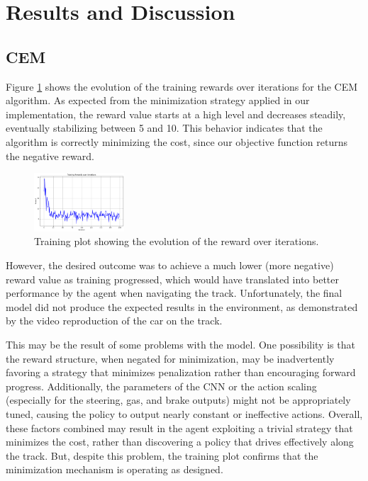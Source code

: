 \documentclass[../CSC_52081_EP.tex]{subfiles}
\begin{document}
\section{Results and Discussion}

\subsection{CEM}

Figure \ref{fig:train_plot} shows the evolution of the training rewards over iterations for the CEM algorithm. As expected from the minimization strategy applied in our implementation, the reward value starts at a high level and decreases steadily, eventually stabilizing between 5 and 10. This behavior indicates that the algorithm is correctly minimizing the cost, since our objective function returns the negative reward.

\begin{figure}[H]
    \centering
    \includegraphics[width=0.3\textwidth]{figures/CEM_train.png}
    \caption{Training plot showing the evolution of the reward over iterations.}
    \label{fig:train_plot}
\end{figure}

However, the desired outcome was to achieve a much lower (more negative) reward value as training progressed, which would have translated into better performance by the agent when navigating the track. Unfortunately, the final model did not produce the expected results in the environment, as demonstrated by the video reproduction of the car on the track.

This may be the result of some problems with the model. One possibility is that the reward structure, when negated for minimization, may be inadvertently favoring a strategy that minimizes penalization rather than encouraging forward progress. Additionally, the parameters of the CNN or the action scaling (especially for the steering, gas, and brake outputs) might not be appropriately tuned, causing the policy to output nearly constant or ineffective actions. Overall, these factors combined may result in the agent exploiting a trivial strategy that minimizes the cost, rather than discovering a policy that drives effectively along the track. But, despite this problem, the training plot confirms that the minimization mechanism is operating as designed.
\end{document}
